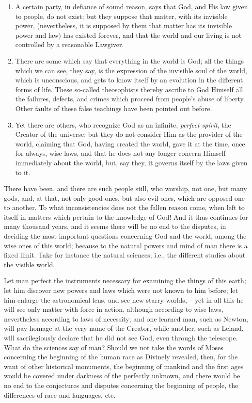 \begin{enumerate}
    \item A certain party, in defiance of sound reason, says that God, and His law given to people, do not exist; but they suppose that matter, with its invisible power, (nevertheless, it is supposed by them that matter has its invisible power and law) has existed forever, and that the world and our living is not controlled by a reasonable Lawgiver.
    \item There are some which say that everything in the world is God; all the things which we can see, they say, is the expression of the invisible soul of the world, which is unconscious, and gets to know itself by an evolution in the different forms of life. These so-called theosophists thereby ascribe to God Himself all the failures, defects, and crimes which proceed from people's abuse of liberty. Other faults of these false teachings have been pointed out before.
    \item Yet there are others, who recognize God as an infinite, \textit{perfect spirit}, the Creator of the universe; but they do not consider Him as the provider of the world, claiming that God, having created the world, gave it at the time, once for always, wise laws, and that he does not any longer concern Himself immediately about the world, but, say they, it governs itself by the laws given to it.
\end{enumerate}

There have been, and there are such people still, who worship, not one, but many gods, and, at that, not only good ones, but also evil ones, which are opposed one to another. To what inconsistencies does not the fallen reason come, when left to itself in matters which pertain to the knowledge of God! And it thus continues for many thousand years, and it seems there will be no end to the disputes, in deciding the most important questions concerning God and the world, among the wise ones of this world; because to the natural powers and mind of man there is a fixed limit. Take for instance the natural sciences; i.e., the different studies about the visible world.

Let man perfect the instruments necessary for examining the things of this earth; let him discover new powers and laws which were not known to him before; let him enlarge the astronomical lens, and see new starry worlds, -- yet in all this he will see only matter with force in action, although according to wise laws, nevertheless according to laws of necessity; and one learned man, such as Newton, will pay homage at the very name of the Creator, while another, such as Leland, will sacrilegiously declare that he did not see God, even through the telescope. What do the sciences say of man? Should we not take the words of Moses concerning the beginning of the human race as Divinely revealed, then, for the want of other historical monuments, the beginning of mankind and the first ages would be covered under darkness of the perfectly unknown, and there would be no end to the conjectures and disputes concerning the beginning of people, the differences of race and languages, etc.

